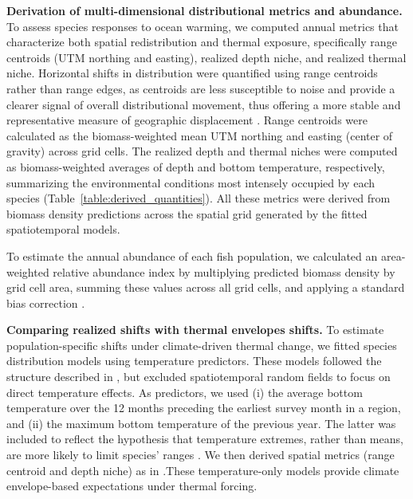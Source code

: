 \documentclass[lineno,pdflatex,sn-nature]{sn-jnl}%
\theoremstyle{thmstyleone}%
\theoremstyle{thmstyletwo}%
\theoremstyle{thmstylethree}%
\begin{document}
\textbf{Derivation of multi-dimensional distributional metrics and abundance.} To assess species responses to ocean warming, we computed annual metrics that characterize both spatial redistribution and thermal exposure, specifically range centroids (UTM northing and easting), realized depth niche, and realized thermal niche. Horizontal shifts in distribution were quantified using range centroids rather than range edges, as centroids are less susceptible to noise and provide a clearer signal of overall distributional movement, thus offering a more stable and representative measure of geographic displacement \citep{shoo_detecting_2006}. Range centroids were calculated as the biomass-weighted mean UTM northing and easting (center of gravity) across grid cells. The realized depth and thermal niches were computed as biomass-weighted averages of depth and bottom temperature, respectively, summarizing the environmental conditions most intensely occupied by each species (Table~\ref{table:derived_quantities}). All these metrics were derived from biomass density predictions across the spatial grid generated by the fitted spatiotemporal models.

To estimate the annual abundance of each fish population, we calculated an area-weighted relative abundance index by multiplying predicted biomass density by grid cell area, summing these values across all grid cells, and applying a standard bias correction \citep{thorson_geostatistical_2015, thorsonImplementingGeneric2016}.

\textbf{Comparing realized shifts with thermal envelopes shifts.}
To estimate population-specific shifts under climate-driven thermal change, we fitted species distribution models using temperature predictors. These models followed the structure described in \textit{}, but excluded spatiotemporal random fields to focus on direct temperature effects. As predictors, we used (i) the average bottom temperature over the 12 months preceding the earliest survey month in a region, and (ii) the maximum bottom temperature of the previous year. The latter was included to reflect the hypothesis that temperature extremes, rather than means, are more likely to limit species’ ranges \citep{sunday_thermal_2019}. We then derived spatial metrics (range centroid and depth niche) as in \textit{}.These temperature-only models provide climate envelope-based expectations under thermal forcing.
\end{document}

